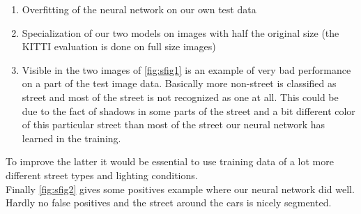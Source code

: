 \begin{enumerate}
    \item Overfitting of the neural network on our own test data
    \item Specialization of our two models on images with half the original
          size (the KITTI evaluation is done on full size images)
    \item Visible in the two images of \cref{fig:sfig1} is an example of very
          bad performance on a part of the test image data. Basically more
          non-street is classified as street and most of the street is not
          recognized as one at all. This could be due to the fact of shadows
          in some parts of the street and a bit different color of this
          particular street than most of the street our neural network has
          learned in the training.
\end{enumerate}
To improve the latter it would be essential to use training data of a lot more
different street types and lighting conditions.\\
Finally \cref{fig:sfig2} gives some positives example where our neural network
did well. Hardly no false positives and the street around the cars is nicely
segmented.








